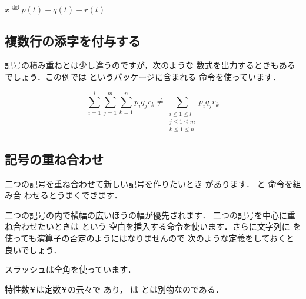 {{\begin{inout}
\newcommand{\defeq}{%
   \stackrel{\mathrm{def}}{=}}
\( x \defeq p(t)+q(t)+r(t) \)
\end{inout}


\subsection{複数行の添字を付与する}

記号の積み重ねとは少し違うのですが，次のような
数式を出力するときもあるでしょう．この例では 
というパッケージに含まれる
命令を使っています．

\begin{inout}
\begin{displaymath}
 \sum^l_{i=1} \sum^m_{j=1} \sum^n_{k=1} 
 p_i q_j r_k \neq \sum_{
 \substack{i\le 1\le l \\ j\le 1 \le m
 \\ k\le 1 \le n}} p_i q_j r_k
\end{displaymath} 
\end{inout}


\subsection{記号の重ね合わせ}%
二つの記号を重ね合わせて新しい記号を作りたいとき
があります． と 命令を組み合
わせるとうまくできます．
\begin{usage}
{} 
\end{usage}

二つの記号の内で横幅の広いほうの幅が優先されます．
二つの記号を中心に重ね合わせたいときは という
空白を挿入する命令を使います．さらに文字列に %
を使っても演算子の否定のようにはなりませんので
次のような定義をしておくと良いでしょう．

\begin{intext}
\newcommand{\cnot}[1]{\ooalign{／\crcr{\hss{#1}\hss}}}
\end{intext}

スラッシュは全角を使っています．

\begin{inout}
\newcommand{\pile}[2]{%
  {\ooalign{#1\crcr#2}}}
\newcommand{\cpile}[2]{{\ooalign{{%
  \hss#1\hss}\crcr{\hss#2\hss}}}}
\newcommand{\cnot}[1]{%
  \ooalign{／\crcr{\hss{#1}\hss}}}
特性数$\pile Y=$は定数$\cpile Y=$の云々で
あり，\cnot{A}は\pile/Aとは別物なのである．
\end{inout}

}}
